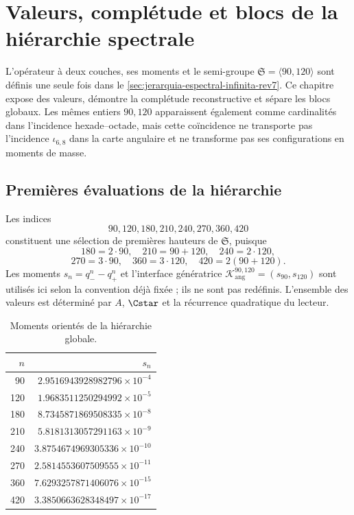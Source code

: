 \chapter{Valeurs, complétude et blocs de la hiérarchie spectrale}
\label{chap:torres}

L'opérateur à deux couches, ses moments et le semi-groupe \(\mathfrak S=\langle90,120\rangle\) sont définis une seule fois dans le \cref{sec:jerarquia-espectral-infinita-rev7}. Ce chapitre expose des valeurs, démontre la complétude reconstructive et sépare les blocs globaux. Les mêmes entiers \(90,120\) apparaissent également comme cardinalités dans l'incidence hexade--octade, mais cette coïncidence ne transporte pas l'incidence \(\iota_{6,8}\) dans la carte angulaire et ne transforme pas ses configurations en moments de masse.

\section{Premières évaluations de la hiérarchie}

Les indices
\[
 90,120,180,210,240,270,360,420
\]
constituent une sélection de premières hauteurs de \(\mathfrak S\), puisque
\[
 180=2\cdot90,\quad210=90+120,\quad240=2\cdot120,
\]
\[
 270=3\cdot90,\quad360=3\cdot120,
 \quad420=2(90+120).
\]
Les moments \(s_n=q_-^n-q_+^n\) et l'interface génératrice \(\mathcal K_{\mathrm{ang}}^{90,120}=(s_{90},s_{120})\) sont utilisés ici selon la convention déjà fixée ; ils ne sont pas redéfinis. L'ensemble des valeurs est déterminé par \(A\), \(\Cstar\) et la récurrence quadratique du lecteur.

\begin{table}[htbp]
\centering
\caption{Moments orientés de la hiérarchie globale.}
\label{tab:torres}
\begin{tabular}{@{}rr@{}}
\toprule
\(n\)&\(s_n\)\\
\midrule
90  & \(2.9516943928982796\times10^{-4}\)\\
120 & \(1.9683511250294992\times10^{-5}\)\\
180 & \(8.7345871869508335\times10^{-8}\)\\
210 & \(5.8181313057291163\times10^{-9}\)\\
240 & \(3.8754674969305336\times10^{-10}\)\\
270 & \(2.5814553607509555\times10^{-11}\)\\
360 & \(7.6293257871406076\times10^{-15}\)\\
420 & \(3.3850663628348497\times10^{-17}\)\\
\bottomrule
\end{tabular}
\end{table}

